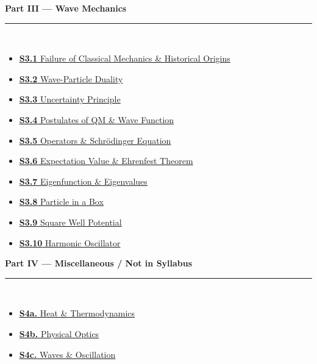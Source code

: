 \documentclass[12pt,a3paper]{article}
\begin{document}
\begin{tcolorbox}[colback=cC!5,colframe=cC,boxrule=1pt,arc=5pt,
  left=8pt,right=8pt,top=8pt,bottom=8pt,before skip=4pt]
  {\large\bfseries\textcolor{cC}{Part III --- Wave Mechanics}}\\[5pt]
  \textcolor{cC!40}{\rule{\textwidth}{0.4pt}}\\[3pt]
  \small\begin{itemize}[leftmargin=1.2em,itemsep=1pt,label={\textcolor{cC}{$\triangleright$}}]
    \item \hyperref[sec:s31]{\textbf{S3.1} Failure of Classical Mechanics \& Historical Origins}
    \item \hyperref[sec:s32]{\textbf{S3.2} Wave-Particle Duality}
    \item \hyperref[sec:s33]{\textbf{S3.3} Uncertainty Principle}
    \item \hyperref[sec:s34]{\textbf{S3.4} Postulates of QM \& Wave Function}
    \item \hyperref[sec:s35]{\textbf{S3.5} Operators \& Schr\"odinger Equation}
    \item \hyperref[sec:s36]{\textbf{S3.6} Expectation Value \& Ehrenfest Theorem}
    \item \hyperref[sec:s37]{\textbf{S3.7} Eigenfunction \& Eigenvalues}
    \item \hyperref[sec:s38]{\textbf{S3.8} Particle in a Box}
    \item \hyperref[sec:s39]{\textbf{S3.9} Square Well Potential}
    \item \hyperref[sec:s40]{\textbf{S3.10} Harmonic Oscillator}
  \end{itemize}
\end{tcolorbox}

\begin{tcolorbox}[colback=cE!5,colframe=cE,boxrule=1pt,arc=5pt,
  left=8pt,right=8pt,top=8pt,bottom=8pt,before skip=4pt]
  {\large\bfseries\textcolor{cE}{Part IV --- Miscellaneous / Not in Syllabus}}\\[5pt]
  \textcolor{cE!40}{\rule{\textwidth}{0.4pt}}\\[3pt]
  \small\begin{itemize}[leftmargin=1.2em,itemsep=1pt,label={\textcolor{cE}{$\triangleright$}}]
    \item \hyperref[sec:s4a]{\textbf{S4a.} Heat \& Thermodynamics}
    \item \hyperref[sec:s4b]{\textbf{S4b.} Physical Optics}
    \item \hyperref[sec:s4c]{\textbf{S4c.} Waves \& Oscillation}
  \end{itemize}
\end{tcolorbox}
\end{document}
